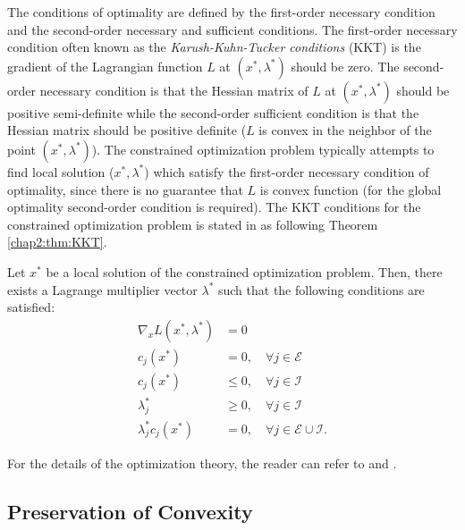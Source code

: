 The conditions of optimality are defined by the first-order necessary condition and the second-order necessary and sufficient conditions.
The first-order necessary condition often known as the \textit{Karush-Kuhn-Tucker conditions} (KKT) is the gradient of the Lagrangian function $L$ at $(x^*,\lambda^*)$ should be zero.
The second-order necessary condition is that the Hessian matrix of $L$ at $(x^*,\lambda^*)$ should be positive semi-definite while the second-order sufficient condition is that the Hessian matrix should be positive definite (\ie $L$ is convex in the neighbor of the point $(x^*,\lambda^*)$).
The constrained optimization problem typically attempts to find local solution ($x^*,\lambda^*$) which satisfy the first-order necessary condition of optimality, since there is no guarantee that $L$ is convex function (\ie for the global optimality second-order condition is required).
The KKT conditions for the constrained optimization problem is stated in \cite{RN9} as following Theorem \ref{chap2:thm:KKT}.

\begin{theorem}
  Let $x^*$ be a local solution of the constrained optimization problem. 
  Then, there exists a Lagrange multiplier vector $\lambda^*$ such that the following conditions are satisfied:
  \begin{equation}
    \begin{aligned}
      \nabla_x L(x^*,\lambda^*) &= 0\\
      c_j(x^*) &= 0, \quad \forall j\in\mathcal E\\
      c_j(x^*) &\leq 0, \quad \forall j\in\mathcal I\\
      \lambda_j^* &\geq 0, \quad \forall j\in\mathcal I\\
      \lambda_j^*c_j(x^*) &= 0, \quad \forall j\in\mathcal E\cup\mathcal I
      .
    \end{aligned}
  \end{equation}
  \label{chap2:thm:KKT}
\end{theorem}
For the details of the optimization theory, the reader can refer to \cite{RN9} and \cite{RN1}.

\subsection{Preservation of Convexity} \label{chap2:sec:convex_preserve}

